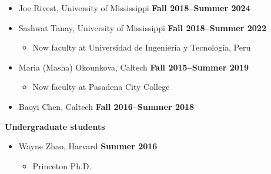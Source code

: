 \documentclass[margin,line]{res}
\begin{document}
\begin{resume}
\begin{itemize}
\begin{itemize}
\vspace{-.05in}
\end{itemize}
\item[] Joe Rivest, University of Mississippi
\hfill {\bf Fall 2018--Summer 2024}
\item[] Sashwat Tanay, University of Mississippi
\hfill {\bf Fall 2018--Summer 2022}
\begin{itemize}
\vspace{-.05in}
\item[] Now faculty at Universidad de Ingeniería y Tecnología, Peru
\vspace{-.05in}
\end{itemize}
\item[] Maria (Masha) Okounkova, Caltech
\hfill {\bf Fall 2015--Summer 2019}
\begin{itemize}
\vspace{-.05in}
\item[] Now faculty at Pasadena City College
\end{itemize}
\item[] Baoyi Chen, Caltech
\hfill {\bf Fall 2016--Summer 2018}
\end{itemize}

%

{\bf Undergraduate students}
\begin{itemize}
\item[] Wayne Zhao, Harvard
\hfill {\bf Summer 2016}
\begin{itemize}
\vspace{-.05in}
\item[] Princeton Ph.D.
\end{itemize}
\end{itemize}


\end{resume}
\end{document}
